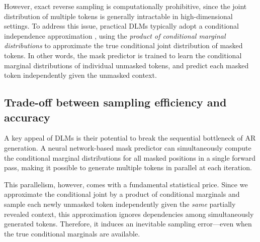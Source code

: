 \documentclass[english]{article}
\begin{document}
However, exact reverse sampling is computationally prohibitive, since the joint distribution of multiple tokens is generally intractable in high-dimensional settings. 
%
To address this issue, practical DLMs typically adopt a conditional independence approximation \citep{nie2025large,wu2025fast}, using the \textit{product of conditional marginal distributions} to approximate the true conditional joint distribution of masked tokens.
%
In other words, the mask predictor is trained to learn the conditional marginal distributions of individual unmasked tokens, and predict each masked token independently given the unmasked context.


\subsection{Trade-off between sampling efficiency and accuracy}


A key appeal of DLMs is their potential to break the sequential bottleneck of AR generation. A neural network-based mask predictor can simultaneously compute the conditional marginal distributions for all masked positions in a single forward pass, making it possible to generate multiple tokens in parallel at each iteration.

This parallelism, however, comes with a fundamental statistical price. Since we approximate the conditional joint by a product of conditional marginals and sample each newly unmasked token independently given the \textit{same} partially revealed context, this approximation ignores dependencies among simultaneously generated tokens. Therefore, it induces an inevitable sampling error---even when the true conditional marginals are available.
\end{document}

